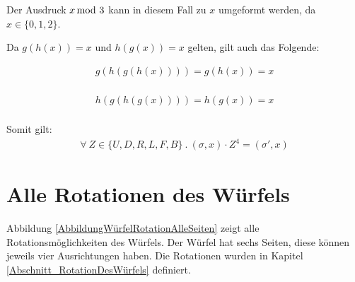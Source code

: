 \documentclass[12pt,a4paper, usenames, dvipsnames]{article}
\theoremstyle{mystyle}
\theoremstyle{definition}
\begin{document}
Der Ausdruck $x \hspace*{-0.5em} \mod 3$ kann in diesem Fall zu $x$ umgeformt werden, da $x \in \{0,1,2\}$. 


Da $g(h(x))=x$ und $h(g(x))=x$ gelten, gilt auch das Folgende:

\begin{minipage}[H]{0.5\textwidth}
	\begin{align*}
		g(h(g(h(x)))) = g(h(x)) = x \\
	\end{align*}
\end{minipage}
\begin{minipage}[H]{0.5\textwidth}
      \begin{align*}
			h(g(h(g(x)))) = h(g(x)) = x \\
	  \end{align*}
\end{minipage}

Somit gilt:
\begin{align*}
\forall \ Z \in \{U, D, R, L, F, B\} \ . \ (\sigma, x) \cdot Z^4 = (\sigma', x)
\end{align*}



%
%
%
%
%
%
%
%
%
%
%
%
%
%
%
%
%
%
%
\newpage

\section{Alle Rotationen des Würfels}
\label{Anhang_RotationenDesWürfels}

Abbildung \ref{AbbildungWürfelRotationAlleSeiten} zeigt alle Rotationsmöglichkeiten des Würfels. Der Würfel hat sechs Seiten, diese können jeweils vier Ausrichtungen haben. Die Rotationen wurden in Kapitel \ref{Abschnitt_RotationDesWürfels} definiert.
\end{document}
